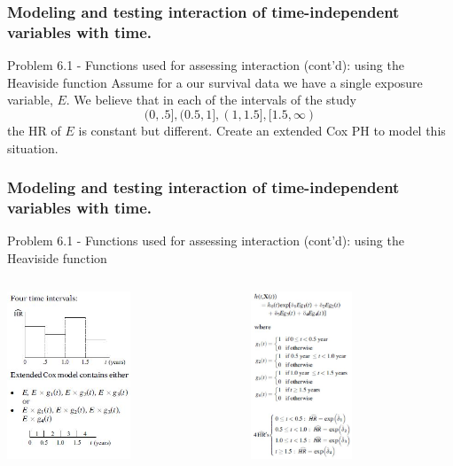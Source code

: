 \documentclass{beamer}
\theoremstyle{definition}
\begin{document}
\begin{frame}
\frametitle{Modeling and testing interaction of time-independent variables with time.} 
\begin{block}{Problem 6.1 - Functions used for assessing interaction (cont'd): using the Heaviside function}
Assume for a our survival data we have a single exposure variable, $E$. We believe that in each of the intervals of the study 
\[
(0,.5], (0.5,1], (1,1.5], [1.5,\infty)
\]
the HR of $E$ is constant but different. Create an extended Cox PH to model this situation. 
\end{block}
\end{frame} 

\begin{frame}
\frametitle{Modeling and testing interaction of time-independent variables with time.} 
\begin{block}{Problem 6.1 - Functions used for assessing interaction (cont'd): using the Heaviside function}
\begin{columns}
    \begin{column}{0.48\textwidth}
        \includegraphics[width =\textwidth, height=5cm]{CH6_fhev.JPG}
    \end{column}
    \hspace{-10pt}
    \begin{column}{0.48\textwidth}
         \includegraphics[width =\textwidth, height=5cm]{CH6_fhev2.JPG}
    \end{column}
\end{columns}
\end{block}
\end{frame}
\end{document}
